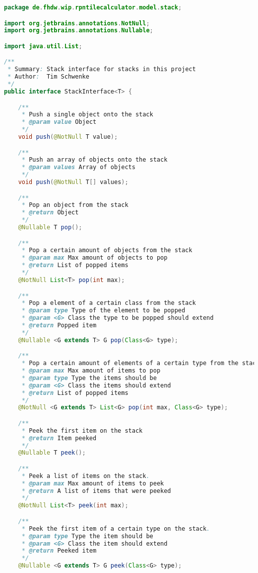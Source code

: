 \begin{lstlisting}[caption=StackInterface (Schwenke),label=list:StackInterface,language=Java]
package de.fhdw.wip.rpntilecalculator.model.stack;

import org.jetbrains.annotations.NotNull;
import org.jetbrains.annotations.Nullable;

import java.util.List;

/**
 * Summary: Stack interface for stacks in this project
 * Author:  Tim Schwenke
 */
public interface StackInterface<T> {

    /**
     * Push a single object onto the stack
     * @param value Object
     */
    void push(@NotNull T value);

    /**
     * Push an array of objects onto the stack
     * @param values Array of objects
     */
    void push(@NotNull T[] values);

    /**
     * Pop an object from the stack
     * @return Object
     */
    @Nullable T pop();

    /**
     * Pop a certain amount of objects from the stack
     * @param max Max amount of objects to pop
     * @return List of popped items
     */
    @NotNull List<T> pop(int max);

    /**
     * Pop a element of a certain class from the stack
     * @param type Type of the element to be popped
     * @param <G> Class the type to be popped should extend
     * @return Popped item
     */
    @Nullable <G extends T> G pop(Class<G> type);

    /**
     * Pop a certain amount of elements of a certain type from the stack.
     * @param max Max amount of items to pop
     * @param type Type the items should be
     * @param <G> Class the items should extend
     * @return List of popped items
     */
    @NotNull <G extends T> List<G> pop(int max, Class<G> type);

    /**
     * Peek the first item on the stack
     * @return Item peeked
     */
    @Nullable T peek();

    /**
     * Peek a list of items on the stack.
     * @param max Max amount of items to peek
     * @return A list of items that were peeked
     */
    @NotNull List<T> peek(int max);

    /**
     * Peek the first item of a certain type on the stack.
     * @param type Type the item should be
     * @param <G> Class the item should extend
     * @return Peeked item
     */
    @Nullable <G extends T> G peek(Class<G> type);


\end{lstlisting}

